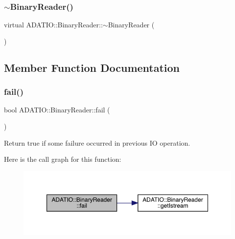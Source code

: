 \subsubsection{\texorpdfstring{$\sim$BinaryReader()}{~BinaryReader()}\hspace{0.1cm}{\footnotesize\ttfamily [3/3]}}
{\footnotesize\ttfamily virtual A\+D\+A\+T\+I\+O\+::\+Binary\+Reader\+::$\sim$\+Binary\+Reader (\begin{DoxyParamCaption}{ }\end{DoxyParamCaption})\hspace{0.3cm}{\ttfamily [virtual]}}



\subsection{Member Function Documentation}
\mbox{\label{classADATIO_1_1BinaryReader_a74e6bd6e0add2d0af3266b2c0578ae5f}} 
\subsubsection{\texorpdfstring{fail()}{fail()}\hspace{0.1cm}{\footnotesize\ttfamily [1/3]}}
{\footnotesize\ttfamily bool A\+D\+A\+T\+I\+O\+::\+Binary\+Reader\+::fail (\begin{DoxyParamCaption}{ }\end{DoxyParamCaption})\hspace{0.3cm}{\ttfamily [virtual]}}



Return true if some failure occurred in previous IO operation. 

Here is the call graph for this function\+:
\nopagebreak
\begin{figure}[H]
\begin{center}
\leavevmode
\includegraphics[width=350pt]{da/dd9/classADATIO_1_1BinaryReader_a74e6bd6e0add2d0af3266b2c0578ae5f_cgraph}
\end{center}
\end{figure}
\mbox{\label{classADATIO_1_1BinaryReader_a4db0ebc0b7edd371bf0daa98e3bc696b}} 
